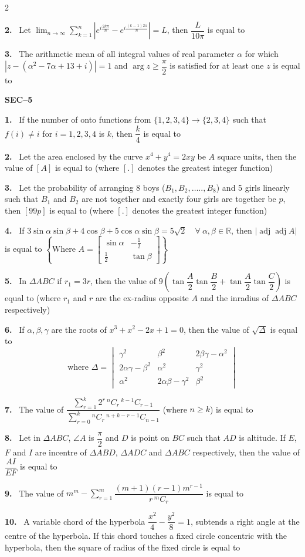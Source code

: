 \documentclass[10pt]{extarticle}
\newcommand{\sect}[1]{\par\smallskip\noindent\textbf{#1}\par}
\newcommand{\qn}[1]{\par\smallskip\noindent\textbf{#1.}~}
\begin{document}
\begin{multicols}{2}
\qn{2} Let $\displaystyle\lim_{n\to\infty}\sum_{k=1}^{n}\left|e^{i\frac{2k\pi}n}-e^{i\frac{(k-1)2\pi}n}\right|=L$, then $\dfrac L{10\pi}$ is equal to
\qn{3} The arithmetic mean of all integral values of real parameter $\alpha$ for which $|z-(\alpha^2-7\alpha+13+i)|=1$ and $\arg z\geqslant\dfrac\pi2$ is satisfied for at least one $z$ is equal to
\sect{SEC--5}
\qn{1} If the number of onto functions from $\{1,2,3,4\}\to\{2,3,4\}$ such that $f(i)\ne i$ for $i=1,2,3,4$ is $k$, then $\dfrac k4$ is equal to
\qn{2} Let the area enclosed by the curve $x^4+y^4=2xy$ be $A$ square units, then the value of $[A]$ is equal to (where $[.]$ denotes the greatest integer function)
\qn{3} Let the probability of arranging 8 boys ($B_1,B_2,\ldots..,B_8$) and 5 girls linearly such that $B_1$ and $B_2$ are not together and exactly four girls are together be $p$, then $[99p]$ is equal to (where $[.]$ denotes the greatest integer function)
\qn{4} If $3\sin\alpha\sin\beta+4\cos\beta+5\cos\alpha\sin\beta=5\sqrt2\quad\forall\ \alpha,\beta\in\mathbb R$, then $|\operatorname{adj}\operatorname{adj}A|$ is equal to $\left\{\text{Where }A=\begin{bmatrix}\sin\alpha&-\frac12\\[2pt]\frac12&\tan\beta\end{bmatrix}\right\}$
\qn{5} In $\Delta ABC$ if $r_1=3r$, then the value of $9\left(\tan\dfrac A2\tan\dfrac B2+\tan\dfrac A2\tan\dfrac C2\right)$ is equal to (where $r_1$ and $r$ are the ex-radius opposite $A$ and the inradius of $\Delta ABC$ respectively)
\qn{6} If $\alpha,\beta,\gamma$ are the roots of $x^3+x^2-2x+1=0$, then the value of $\sqrt\Delta$ is equal to
\[\text{where }\Delta=\begin{vmatrix}\gamma^2&\beta^2&2\beta\gamma-\alpha^2\\2\alpha\gamma-\beta^2&\alpha^2&\gamma^2\\\alpha^2&2\alpha\beta-\gamma^2&\beta^2\end{vmatrix}\]
\qn{7} The value of $\dfrac{\displaystyle\sum_{r=1}^{k}2^r\,{}^nC_r\,{}^{k-1}C_{r-1}}{\displaystyle\sum_{r=0}^{k}{}^nC_r\,{}^{n+k-r-1}C_{n-1}}$ (where $n\ge k$) is equal to
\qn{8} Let in $\Delta ABC$, $\angle A$ is $\dfrac\pi2$ and $D$ is point on $BC$ such that $AD$ is altitude. If $E$, $F$ and $I$ are incentre of $\Delta ABD$, $\Delta ADC$ and $\Delta ABC$ respectively, then the value of $\dfrac{AI}{EF}$ is equal to
\qn{9} The value of $m^m-\displaystyle\sum_{r=1}^{m}\dfrac{(m+1)(r-1)m^{r-1}}{r\,{}^mC_r}$ is equal to
\qn{10} A variable chord of the hyperbola $\dfrac{x^2}4-\dfrac{y^2}8=1$, subtends a right angle at the centre of the hyperbola. If this chord touches a fixed circle concentric with the hyperbola, then the square of radius of the fixed circle is equal to

\end{multicols}
\end{document}

